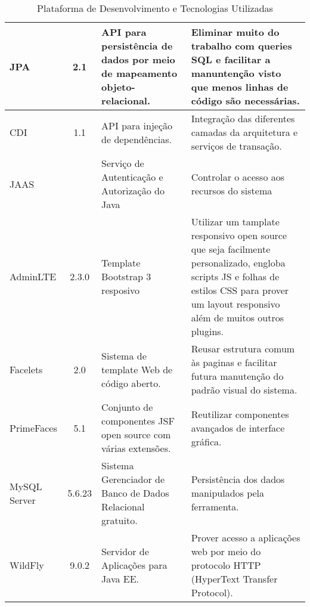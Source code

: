 \begin{table}[h]
\begin{tabular}{|p{1.6cm}|c|p{5cm}|p{6.5cm}|}
		JPA &  2.1  &   API para persistência de dados por meio de mapeamento objeto-relacional.  & Eliminar muito do trabalho com queries SQL e facilitar a manuntenção visto que menos linhas de código são necessárias.\\\hline
		
		CDI & 1.1  & API para injeção de dependências.   & Integração das diferentes camadas da arquitetura e serviços de transação. \\\hline
		
		JAAS & & Serviço de Autenticação e Autorização do Java & Controlar o acesso aos recursos do sistema    \\\hline
		
		AdminLTE & 2.3.0 & Template Bootstrap 3 resposivo &  Utilizar um tamplate responsivo open source que seja facilmente personalizado, engloba scripts	JS e folhas de estilos CSS para prover um layout responsivo além de muitos outros plugins.  \\\hline
		
		Facelets & 2.0 &  Sistema de template Web de código aberto.  & Reusar estrutura comum às paginas e facilitar futura manutenção do padrão visual do sistema.  \\\hline
		 
		  PrimeFaces & 5.1 &  Conjunto de componentes JSF open source com várias extensões.  & Reutilizar componentes avançados de interface gráfica.  \\\hline
		  
		MySQL Server &  5.6.23  & Sistema Gerenciador de Banco de Dados Relacional gratuito.    &  Persistência dos dados manipulados pela ferramenta.  \\\hline
		
		WildFly & 9.0.2 &  Servidor de Aplicações para Java EE. &  Prover acesso a aplicações web por meio do protocolo HTTP (HyperText Transfer Protocol). \\\hline
		
		
		
		
		                              
	\end{tabular}
	\caption{Plataforma de Desenvolvimento e Tecnologias Utilizadas}	
	\label{tabela-plataforma}
\end{table}






